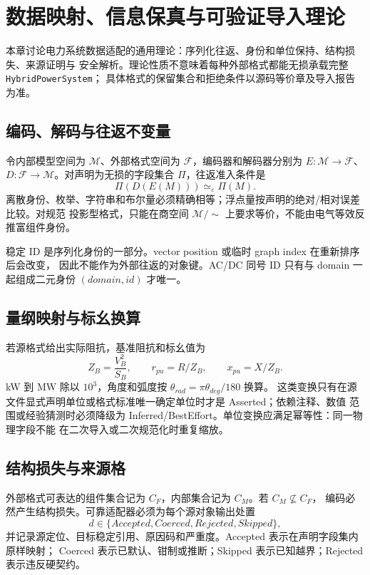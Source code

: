 \section{数据映射、信息保真与可验证导入理论}\label{sec:io-theory}

\begin{theorynote}
本章讨论电力系统数据适配的通用理论：序列化往返、身份和单位保持、结构损失、来源证明与
安全解析。理论性质不意味着每种外部格式都能无损承载完整 \texttt{HybridPowerSystem}；
具体格式的保留集合和拒绝条件以源码等价章及导入报告为准。
\end{theorynote}

\subsection{编码、解码与往返不变量}
令内部模型空间为 $\mathcal M$、外部格式空间为 $\mathcal F$，编码器和解码器分别为
$E:\mathcal M\to\mathcal F$、$D:\mathcal F\to\mathcal M$。对声明为无损的字段集合
$\Pi$，往返准入条件是
\begin{equation}
 \Pi(D(E(M)))\simeq_\varepsilon\Pi(M).
\end{equation}
离散身份、枚举、字符串和布尔量必须精确相等；浮点量按声明的绝对/相对误差比较。对规范
投影型格式，只能在商空间 $\mathcal M/{\sim}$ 上要求等价，不能由电气等效反推富组件身份。

稳定 ID 是序列化身份的一部分。vector position 或临时 graph index 在重新排序后会改变，
因此不能作为外部往返的对象键。AC/DC 同号 ID 只有与 domain 一起组成二元身份
$(domain,id)$ 才唯一。

\subsection{量纲映射与标幺换算}
若源格式给出实际阻抗，基准阻抗和标幺值为
\begin{equation}
 Z_B=\frac{V_B^2}{S_B},\qquad r_{pu}=R/Z_B,\qquad x_{pu}=X/Z_B.
\end{equation}
kW 到 MW 除以 $10^3$，角度和弧度按 $\theta_{rad}=\pi\theta_{deg}/180$ 换算。
这类变换只有在源文件显式声明单位或格式标准唯一确定单位时才是 Asserted；依赖注释、数值
范围或经验猜测时必须降级为 Inferred/BestEffort。单位变换应满足幂等性：同一物理字段不能
在二次导入或二次规范化时重复缩放。

\subsection{结构损失与来源格}
外部格式可表达的组件集合记为 $C_F$，内部集合记为 $C_M$。若 $C_M\not\subseteq C_F$，
编码必然产生结构损失。可靠适配器必须为每个源对象输出处置
\begin{equation}
 d\in\{Accepted,Coerced,Rejected,Skipped\},
\end{equation}
并记录源定位、目标稳定引用、原因码和严重度。Accepted 表示在声明字段集内原样映射；
Coerced 表示已默认、钳制或推断；Skipped 表示已知越界；Rejected 表示违反硬契约。

